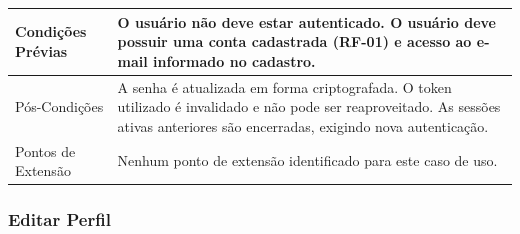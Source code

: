 \begin{longtable}{ >{\raggedright}p{2.8cm} | >{\raggedright\arraybackslash}p{10.7cm} }
Condições Prévias & O usuário não deve estar autenticado. O usuário deve possuir uma conta cadastrada (RF-01) e acesso ao e-mail informado no cadastro. \\ \hline

Pós-Condições & A senha é atualizada em forma criptografada. O token utilizado é invalidado e não pode ser reaproveitado. As sessões ativas anteriores são encerradas, exigindo nova autenticação. \\ \hline

Pontos de Extensão & Nenhum ponto de extensão identificado para este caso de uso. \\
\end{longtable}
\renewcommand{\arraystretch}{1}
\FloatBarrier


\subsubsection{Editar Perfil}

